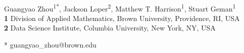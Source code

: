 \documentclass[10pt,letterpaper]{article}
\date{}
\begin{document}
\vspace*{0.2in}


\begin{flushleft}
{\Large
\textbf{} 
}
\newline
\\
Guangyao Zhou\textsuperscript{1*},
Jackson Loper\textsuperscript{2},
Matthew T. Harrison\textsuperscript{1},
Stuart Geman\textsuperscript{1}
\\
\bigskip
\textbf{1} Division of Applied Mathematics, Brown University, Providence, RI, USA
\\
\textbf{2} Data Science Institute, Columbia University, New York, NY, USA
\\
\bigskip

* guangyao\_zhou@brown.edu

\end{flushleft}
\end{document}
